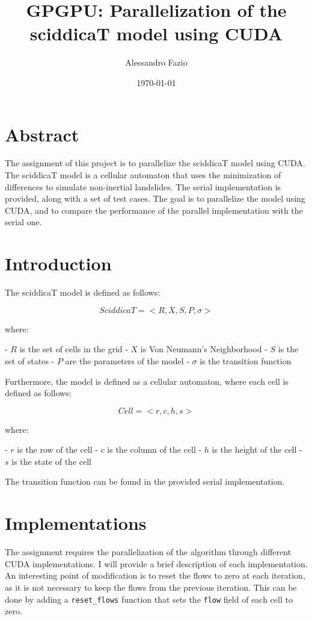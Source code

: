 \documentclass{article}
\title{GPGPU: Parallelization of the sciddicaT model using CUDA}
\author{Alessandro Fazio}
\date{\today}
\begin{document}
\maketitle


\section{Abstract}
The assignment of this project is to parallelize the sciddicaT model using CUDA. The sciddicaT model is a cellular automaton that uses the minimization of differences to simulate non-inertial landslides. The serial implementation is provided, along with a set of test cases. The goal is to parallelize the model using CUDA, and to compare the performance of the parallel implementation with the serial one.

\section{Introduction}
The sciddicaT model is defined as follows:

$$
	SciddicaT = <R,X,S,P,\sigma>
$$

where:

- $R$ is the set of cells in the grid
- $X$ is Von Neumann's Neighborhood
- $S$ is the set of states
- $P$ are the parameters of the model
- $\sigma$ is the transition function

Furthermore, the model is defined as a cellular automaton, where each cell is defined as follows:

$$
	Cell = <r,c,h,s>
$$

where:

- $r$ is the row of the cell
- $c$ is the column of the cell
- $h$ is the height of the cell
- $s$ is the state of the cell

The transition function can be found in the provided serial implementation.

\section{Implementations}
The assignment requires the parallelization of the algorithm through different CUDA implementations. I will provide a brief description of each implementation. 
An interesting point of modification is to reset the flows to zero at each iteration, as it is not necessary to keep the flows from the previous iteration. This can be done by adding a \texttt{reset\_flows} function that sets the \texttt{flow} field of each cell to zero.
\end{document}
